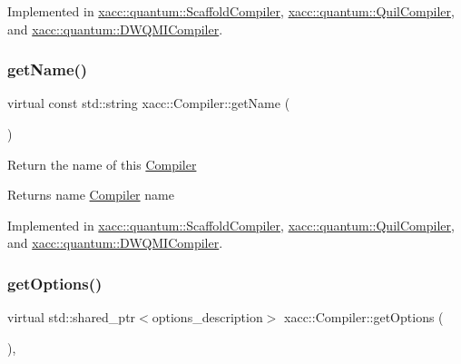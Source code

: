 Implemented in \hyperlink{a01177_a3736ecc229fe6acdd4c991e85d7a1f08}{xacc\+::quantum\+::\+Scaffold\+Compiler}, \hyperlink{a01157_adf4d321ecb0df3fa7728999f941c83b2}{xacc\+::quantum\+::\+Quil\+Compiler}, and \hyperlink{a01137_aa22591343b5509bf2c3a5820130ba906}{xacc\+::quantum\+::\+D\+W\+Q\+M\+I\+Compiler}.

\mbox{\label{a01629_a87fca9100e6462122f5b687c3a0fb3fb}} 
\subsubsection{\texorpdfstring{get\+Name()}{getName()}}
{\footnotesize\ttfamily virtual const std\+::string xacc\+::\+Compiler\+::get\+Name (\begin{DoxyParamCaption}{ }\end{DoxyParamCaption})\hspace{0.3cm}{\ttfamily [pure virtual]}}

Return the name of this \hyperlink{a01629}{Compiler} \begin{DoxyReturn}{Returns}
name \hyperlink{a01629}{Compiler} name 
\end{DoxyReturn}


Implemented in \hyperlink{a01177_a3f537054a3924a1d14f4ceb0f0181161}{xacc\+::quantum\+::\+Scaffold\+Compiler}, \hyperlink{a01157_ae7d52140b6dd52730edc6e38ae48f437}{xacc\+::quantum\+::\+Quil\+Compiler}, and \hyperlink{a01137_aed42de96f8e0dd94b6de183f28aee419}{xacc\+::quantum\+::\+D\+W\+Q\+M\+I\+Compiler}.

\mbox{\label{a01629_a9f5a8965c9c2dd895016d18264ebbe92}} 
\subsubsection{\texorpdfstring{get\+Options()}{getOptions()}}
{\footnotesize\ttfamily virtual std\+::shared\+\_\+ptr$<$options\+\_\+description$>$ xacc\+::\+Compiler\+::get\+Options (\begin{DoxyParamCaption}{ }\end{DoxyParamCaption})\hspace{0.3cm}{\ttfamily [inline]}, {\ttfamily [virtual]}}

